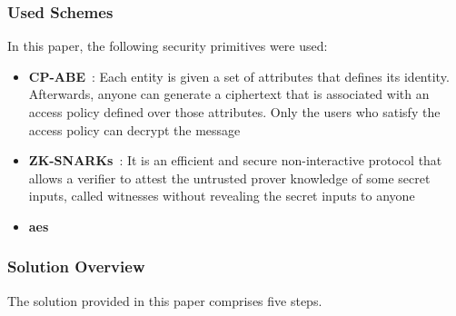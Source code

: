 \subsubsection{Used Schemes}
In this paper, the following security primitives were used:

\begin{itemize}
    \item \textbf{CP-ABE}~\cite{bethencourt2007ciphertext}: Each entity is given a set of attributes that defines its identity.
    Afterwards, anyone can generate a ciphertext that is associated with an access policy defined over those attributes.
    Only the users who satisfy the access policy can decrypt the message
    \item \textbf{ZK-SNARKs}~\cite{ben2013succinct}: It is an efficient and secure non-interactive protocol that allows a verifier to attest the untrusted prover knowledge of some secret inputs, called witnesses without revealing the secret inputs to anyone
    \item \textbf{\ac{aes}}
\end{itemize}

\subsubsection{Solution Overview}
The solution provided in this paper comprises five steps.

